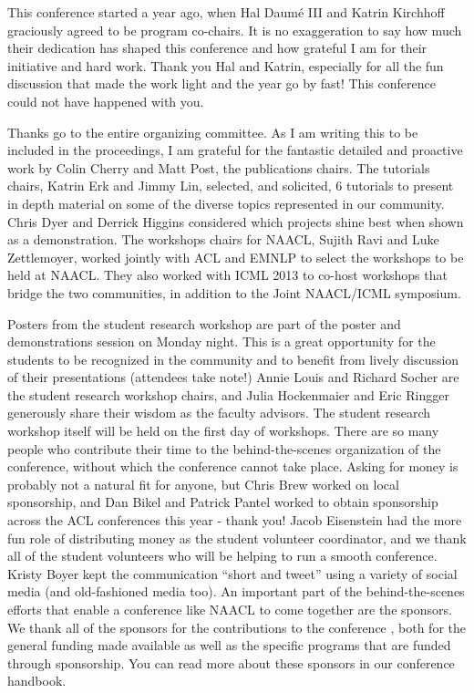 This conference started a year ago, when Hal Daum\'{e} III and Katrin Kirchhoff graciously agreed to be program co-chairs. It is no exaggeration to say how much their dedication has shaped this conference and how grateful I am for their initiative and hard work. Thank you Hal and Katrin, especially for all the fun discussion that made the work light and the year go by fast!  This conference could not have happened with you.

Thanks go to the entire organizing committee. As I am writing this to be included in the proceedings, I am grateful for the fantastic detailed and proactive work by Colin Cherry and Matt Post, the publications chairs.  The tutorials chairs, Katrin Erk and Jimmy Lin, selected, and solicited, 6 tutorials to present in depth material on some of the diverse topics represented in our community. Chris Dyer and Derrick Higgins considered which projects shine best when shown as a demonstration.  The workshops chairs for NAACL, Sujith Ravi and Luke Zettlemoyer, worked jointly with ACL and EMNLP to select the workshops to be held at NAACL. They also worked with ICML 2013 to co-host workshops that bridge the two communities, in addition to the Joint NAACL/ICML symposium.

Posters from the student research workshop are part of the poster and demonstrations session on Monday night. This is a great opportunity for the students to be recognized in the community and to benefit from lively discussion of their presentations (attendees take note!) Annie Louis and Richard Socher are the student research workshop chairs, and Julia Hockenmaier and Eric Ringger generously share their wisdom as the faculty advisors.  The student research workshop itself will be held on the first day of workshops.
There are so many people who contribute their time to the behind-the-scenes organization of the conference, without which the conference cannot take place. Asking for money is probably not a natural fit for anyone, but Chris Brew worked on local sponsorship, and Dan Bikel and Patrick Pantel worked to obtain sponsorship across the ACL conferences this year - thank you!  Jacob Eisenstein had the more fun role of distributing money as the student volunteer coordinator, and we thank all of the student volunteers who will be helping to run a smooth conference.  Kristy Boyer kept the communication ``short and tweet'' using a variety of social media (and old-fashioned media too).
An important part of the behind-the-scenes efforts that enable a conference like NAACL to come together are the sponsors. We thank all of the sponsors for the contributions to the conference , both for the general funding made available as well as the specific programs that are funded through sponsorship.  You can read more about these sponsors in our conference handbook.

